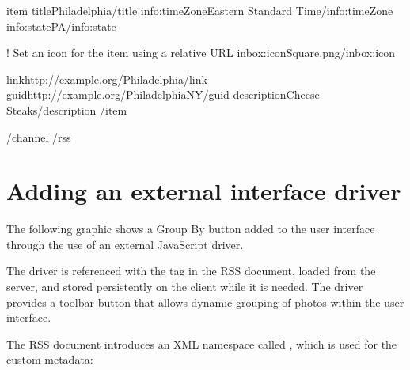 \documentclass[letterpaper,12pt,english,openany,oneside]{sphinxmanual}
\begin{document}
\begin{sphinxVerbatim}[commandchars=\\\{\}]
       \PYGZlt{}item\PYGZgt{}
           \PYGZlt{}title\PYGZgt{}Philadelphia\PYGZlt{}/title\PYGZgt{}
           \PYGZlt{}info:timeZone\PYGZgt{}Eastern Standard Time\PYGZlt{}/info:timeZone\PYGZgt{}
           \PYGZlt{}info:state\PYGZgt{}PA\PYGZlt{}/info:state\PYGZgt{}

           \PYGZlt{}!\PYGZhy{}\PYGZhy{} Set an icon for the item using a relative URL \PYGZhy{}\PYGZhy{}\PYGZgt{}
           \PYGZlt{}inbox:icon\PYGZgt{}Square.png\PYGZlt{}/inbox:icon\PYGZgt{}

           \PYGZlt{}link\PYGZgt{}http://example.org/Philadelphia\PYGZlt{}/link\PYGZgt{}
           \PYGZlt{}guid\PYGZgt{}http://example.org/PhiladelphiaNY\PYGZlt{}/guid\PYGZgt{}
           \PYGZlt{}description\PYGZgt{}Cheese Steaks\PYGZlt{}/description\PYGZgt{}
       \PYGZlt{}/item\PYGZgt{}

   \PYGZlt{}/channel\PYGZgt{}
\PYGZlt{}/rss\PYGZgt{}
\end{sphinxVerbatim}




\section{Adding an external interface driver}
\label{\detokenize{Tracker_Examples:adding-an-external-interface-driver}}
The following graphic shows a Group By button added to the user interface through the use of an external JavaScript driver.

\noindent{}

The driver is referenced with the  tag in the RSS document, loaded from the server, and stored persistently on the client while it is needed. The driver provides a toolbar button that allows dynamic grouping of photos within the user interface.

The RSS document introduces an XML namespace called  , which is used for the custom metadata:

\begin{sphinxVerbatim}[commandchars=\\\{\}]
 
 
\end{sphinxVerbatim}
\end{document}
